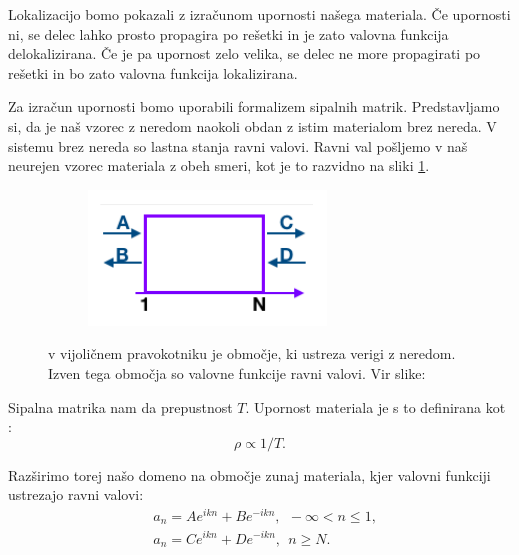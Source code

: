 \begin{appendices}
Lokalizacijo bomo pokazali z izračunom upornosti našega materiala. Če upornosti ni, se delec lahko prosto propagira po rešetki in je zato valovna funkcija delokalizirana. Če je pa upornost zelo velika, se delec ne more propagirati po rešetki in bo zato valovna funkcija lokalizirana.

Za izračun upornosti bomo uporabili formalizem sipalnih matrik. Predstavljamo si, da je naš vzorec z neredom naokoli obdan z istim materialom  brez nereda. V sistemu brez nereda so lastna stanja ravni valovi. Ravni val pošljemo v naš neurejen vzorec materiala z obeh smeri, kot je to razvidno na sliki \ref{fig:Sipanje}.
\begin{figure}[!h]
\centering
\begin{subfigure}{.5\textwidth}
\includegraphics[width=\linewidth]{Figures/Sipanje.pdf}
\end{subfigure}
\caption{v vijoličnem pravokotniku je območje, ki ustreza verigi z neredom. Izven tega območja so valovne funkcije ravni valovi. Vir slike: \cite{anderson}}
\label{fig:Sipanje}
\end{figure}
Sipalna matrika nam da prepustnost $T$. Upornost materiala je s to definirana kot \cite{landauer}:
\begin{equation}
\rho \propto 1/T.
\end{equation}

Razširimo torej našo domeno na območje zunaj materiala, kjer valovni funkciji ustrezajo ravni valovi:
\begin{align}
&a_n = A e^{i k n} + B e^{-i k n}, \ \ - \infty < n \leq 1, \\
&a_n = C e^{ikn} + D e^{- ik n},  \ \ n \geq N.
\end{align}


\end{appendices}
